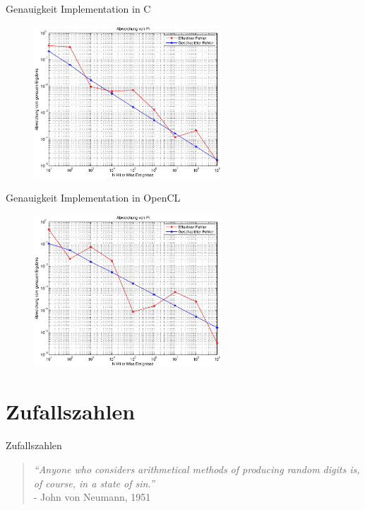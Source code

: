 \documentclass{beamer}
\begin{document}
\begin{frame}{Genauigkeit}
	Implementation in C
	\begin{figure}
		\centering
		\includegraphics[width=7cm]{images/Abweichung_C.eps}
	\end{figure}
\end{frame}
\begin{frame}{Genauigkeit}
	Implementation in OpenCL
	\begin{figure}
		\centering
		\includegraphics[width=7cm]{images/Abweichung_OpenCl.eps}
	\end{figure}
\end{frame}

\section{Zufallszahlen}
\begin{frame}{Zufallszahlen}
	\begin{quote}
	\textit{“Anyone who considers arithmetical methods of producing random digits is, of course, in a state of sin.”} \\ - John von Neumann, 1951
	\end{quote}
\end{frame}
\end{document}
